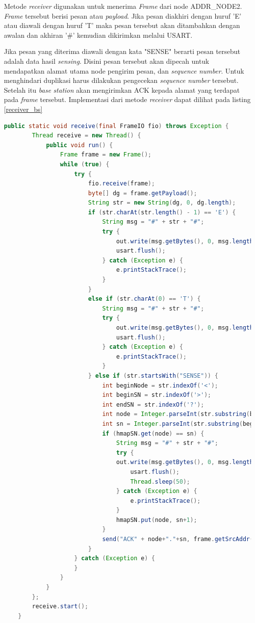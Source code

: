 Metode \textit{receiver} digunakan untuk menerima \textit{Frame} dari node ADDR\_NODE2. \textit{Frame} tersebut berisi pesan atau \textit{payload}. Jika pesan diakhiri dengan huruf 'E' atau diawali dengan huruf 'T' maka pesan tersebut akan ditambahkan dengan awalan dan akhiran '\#' kemudian dikirimkan melalui USART. 

Jika pesan yang diterima diawali dengan kata "SENSE" berarti pesan tersebut adalah data hasil \textit{sensing}. Disini pesan tersebut akan dipecah untuk mendapatkan alamat utama node pengirim pesan, dan \textit{sequence number}. Untuk menghindari duplikasi harus dilakukan pengecekan \textit{sequence number} tersebut. Setelah itu \textit{base station} akan mengirimkan ACK kepada alamat yang terdapat pada \textit{frame} tersebut.
Implementasi dari metode \textit{receiver} dapat dilihat pada listing \ref{receiver_bs}
\begin{lstlisting}[label=receiver_bs, language=Java, caption=Metode receiver pada kelas BS, numbers=none]
    public static void receive(final FrameIO fio) throws Exception {
		Thread receive = new Thread() {
			public void run() {
				Frame frame = new Frame();
				while (true) {
					try {
						fio.receive(frame);
						byte[] dg = frame.getPayload();
						String str = new String(dg, 0, dg.length);						
						if (str.charAt(str.length() - 1) == 'E') {
							String msg = "#" + str + "#";
							try {
								out.write(msg.getBytes(), 0, msg.length());
								usart.flush();
							} catch (Exception e) {
								e.printStackTrace();
							}
						}
						else if (str.charAt(0) == 'T') {
							String msg = "#" + str + "#";
							try {
								out.write(msg.getBytes(), 0, msg.length());
								usart.flush();
							} catch (Exception e) {
								e.printStackTrace();
							}
						} else if (str.startsWith("SENSE")) {
							int beginNode = str.indexOf('<');
							int beginSN = str.indexOf('>');
							int endSN = str.indexOf('?');
							int node = Integer.parseInt(str.substring(beginNode + 1, beginSN));
							int sn = Integer.parseInt(str.substring(beginSN + 1, endSN));
							if (hmapSN.get(node) == sn) {
								String msg = "#" + str + "#";
								try {
								out.write(msg.getBytes(), 0, msg.length());
									usart.flush();
									Thread.sleep(50);
								} catch (Exception e) {
									e.printStackTrace();
								}
								hmapSN.put(node, sn+1);
							}
							send("ACK" + node+"."+sn, frame.getSrcAddr(), fio);
						}
					} catch (Exception e) {
					}
				}
			}
		};
		receive.start();
	}
\end{lstlisting}

